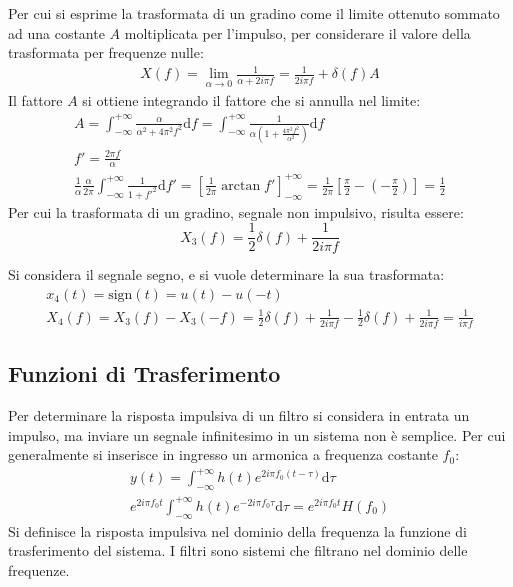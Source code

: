 \documentclass{article}
\newcommand{\df}{\mathrm{d}}
\numberwithin{equation}{subsection}
\begin{document}
Per cui si esprime la trasformata di un gradino come il limite ottenuto sommato ad una costante $A$ moltiplicata per l'impulso, per considerare il valore della trasformata 
per frequenze nulle: 
\begin{gather*}
    X(f)=\displaystyle\lim_{\alpha\to0}\frac{1}{\alpha+2i\pi f}=\frac{1}{2i\pi f}+\delta(f)A
\end{gather*}
Il fattore $A$ si ottiene integrando il fattore che si annulla nel limite:
\begin{gather*}
    A=\displaystyle\int_{-\infty}^{+\infty}\frac{\alpha}{\alpha^2+4\pi^2f^2}\df f=\int_{-\infty}^{+\infty}\frac{1}{\alpha\left(1+\frac{4\pi^2f^2}{\alpha^2}\right)}\df f\\
    f'=\displaystyle\frac{2\pi f}{\alpha}\\
    \displaystyle\frac{1}{\alpha}\frac{\alpha}{2\pi}\int_{-\infty}^{+\infty}\frac{1}{1+f'^2}\df f'=\left[\frac{1}{2\pi}\arctan f'\right]^{+\infty}_{-\infty}=\frac{1}{2\pi}\left[\frac{\pi}{2}-\left(-\frac{\pi}{2}\right)\right]=\frac{1}{2}
\end{gather*}
Per cui la trasformata di un gradino, segnale non impulsivo, risulta essere:
\begin{equation*}
    X_3(f)=\displaystyle\frac{1}{2}\delta(f)+\frac{1}{2i\pi f}
\end{equation*}


Si considera il segnale segno, e si vuole determinare la sua trasformata:
\begin{gather*}
    x_4(t)=\mbox{sign}(t)=u(t)-u(-t)\\
    X_4(f)=X_3(f)-X_3(-f)=\displaystyle\frac{1}{2}\delta(f)+\frac{1}{2i\pi f}-\frac{1}{2}\delta(f)+\frac{1}{2i\pi f}=\frac{1}{i\pi f}
\end{gather*}

\subsection{Funzioni di Trasferimento}

Per determinare la risposta impulsiva di un filtro si considera in entrata un impulso, ma inviare un segnale infinitesimo in un sistema non è semplice. Per cui generalmente 
si inserisce in ingresso un armonica a frequenza costante $f_0$:
\begin{gather*}
    y(t)=\displaystyle\int_{-\infty}^{+\infty}h(t)e^{2i\pi f_0(t-\tau)}\df\tau\\
    e^{2i\pi f_0t}\displaystyle\int_{-\infty}^{+\infty}h(t)e^{-2i\pi f_0\tau}\df\tau=e^{2i\pi f_0t}H(f_0)
\end{gather*}
Si definisce la risposta impulsiva nel dominio della frequenza la funzione di trasferimento del sistema. I filtri sono sistemi che filtrano nel dominio delle frequenze. 
\end{document}

